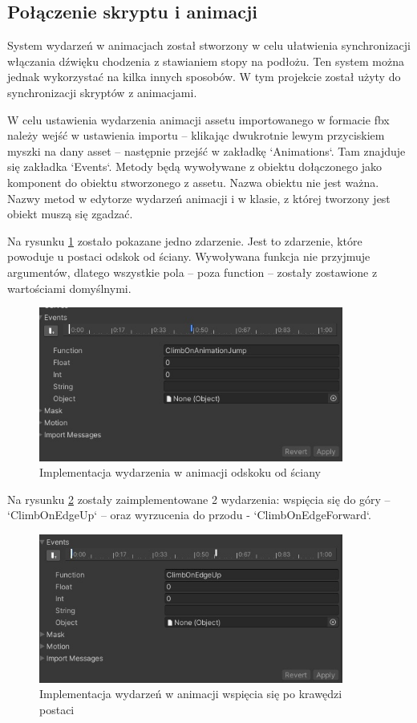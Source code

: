 \documentclass[12pt,twoside]{article}
\begin{document}
\subsection{Połączenie skryptu i animacji}
System wydarzeń w animacjach został stworzony w celu ułatwienia synchronizacji
włączania dźwięku chodzenia z stawianiem stopy na podłożu. Ten system można
jednak wykorzystać na kilka innych sposobów. W tym projekcie został użyty do
synchronizacji skryptów z animacjami. 

W celu ustawienia wydarzenia animacji assetu importowanego w formacie fbx należy
wejść w ustawienia importu -- klikając dwukrotnie lewym przyciskiem myszki na
dany asset -- następnie przejść w zakładkę `Animations`. Tam znajduje się
zakładka `Events`. Metody będą wywoływane z obiektu dołączonego jako komponent
do obiektu stworzonego z assetu. Nazwa obiektu nie jest ważna. Nazwy metod w
edytorze wydarzeń animacji i w klasie, z której tworzony jest obiekt muszą się
zgadzać. 

Na rysunku \ref{Hero:AnimEvent:ClimbOnAnimationJump} zostało pokazane jedno
zdarzenie. Jest to zdarzenie, które powoduje u postaci odskok od ściany.
Wywoływana funkcja nie przyjmuje argumentów, dlatego wszystkie pola -- poza
function -- zostały zostawione z wartościami domyślnymi. 

\begin{figure}[!ht]
    \centering
	\includegraphics[width=10cm]{RealizacjaProjektu/UnityPictires/Animator/Player1_ClimbOnAnimationJump.jpg}
	\caption{Implementacja wydarzenia w animacji odskoku od ściany}
    \label{Hero:AnimEvent:ClimbOnAnimationJump}
\end{figure}

Na rysunku \ref{Hero:AnimEvent:OnEdgeClimb}  zostały zaimplementowane 2
wydarzenia: wspięcia się do góry -- `ClimbOnEdgeUp` -- oraz wyrzucenia do przodu -
`ClimbOnEdgeForward`. 

\begin{figure}[!ht]
    \centering
	\includegraphics[width=10cm]{RealizacjaProjektu/UnityPictires/Animator/Player1_OnEdgeClimb.jpg}
	\caption{Implementacja wydarzeń w animacji wspięcia się po krawędzi postaci}
    \label{Hero:AnimEvent:OnEdgeClimb}
\end{figure}
\end{document}
